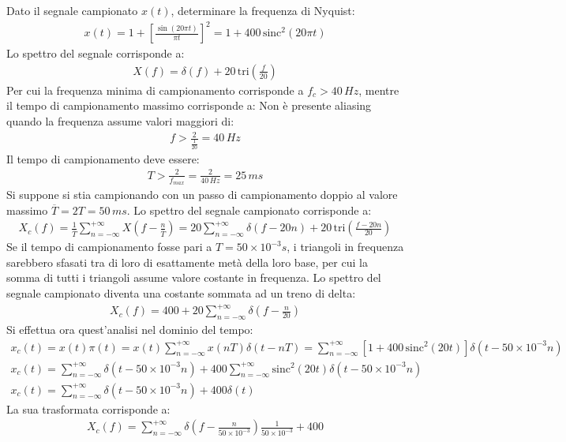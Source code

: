 \documentclass{article}
\newcommand{\sinc}{\mbox{sinc}}
\begin{document}
Dato il segnale campionato $x(t)$, determinare la frequenza di Nyquist: 
\begin{gather*}
    x(t)=1+\left[\displaystyle\frac{\sin(20\pi t)}{\pi t}\right]^2=1+400\,\sinc^2\left(20\pi t\right)
\end{gather*}
Lo spettro del segnale corrisponde a:
\begin{gather*}
    X(f)=\displaystyle \delta(f)+20\,\mbox{tri}\left(\frac{f}{20}\right)
\end{gather*}
Per cui la frequenza minima di campionamento corrisponde a $f_c>40\,Hz$, mentre il tempo di campionamento massimo corrisponde a:
Non è presente aliasing quando la frequenza assume valori maggiori di:
\begin{gather*}
    f>\displaystyle\frac{2}{\frac{1}{20}}=40\,Hz
\end{gather*}
Il tempo di campionamento deve essere:
\begin{gather}
    T>\displaystyle\frac{2}{f_{max}}=\frac{2}{40\,Hz}=25\,ms
\end{gather}
Si suppone si stia campionando con un passo di campionamento doppio al valore massimo $\overline{T}=2T=50\,ms$. Lo spettro del segnale campionato corrisponde a:
\begin{gather*}
    X_c(f)=\displaystyle \frac{1}{\overline{T}}\sum_{n=-\infty}^{+\infty}X\left(f-\frac{n}{\overline{T}}\right)=20\sum_{n=-\infty}^{+\infty}\delta(f-20n)+20\,\mbox{tri}\left(\frac{f-20n}{20}\right)
\end{gather*}
Se il tempo di campionamento fosse pari a $T=50\times10^{-3}s$, i triangoli in frequenza sarebbero sfasati tra di loro di esattamente metà della loro base, per cui la 
somma di tutti i triangoli assume valore costante in frequenza. 
Lo spettro del segnale campionato diventa una costante sommata ad un treno di delta:
\begin{gather}
    X_c(f)=400+20\displaystyle\sum_{n=-\infty}^{+\infty}\delta\left(f-\frac{n}{20}\right)
\end{gather}
Si effettua ora quest'analisi nel dominio del tempo:
\begin{gather*}
    x_c(t)=x(t)\pi(t)=x(t)\displaystyle\sum_{n=-\infty}^{+\infty}x(nT)\delta(t-nT)=\sum_{n=-\infty}^{+\infty}\left[1+400\,\sinc^2\left(20t\right)\right]\delta(t-50\times10^{-3}n)\\
    x_c(t)=\displaystyle\sum_{n=-\infty}^{+\infty}\delta(t-50\times10^{-3}n)+400\sum_{n=-\infty}^{+\infty}\sinc^2(20t)\delta(t-50\times10^{-3}n)\\
    x_c(t)=\displaystyle\sum_{n=-\infty}^{+\infty}\delta(t-50\times10^{-3}n)+400\delta(t)
\end{gather*}
La sua trasformata corrisponde a:
\begin{gather*}
    X_c(f)=\displaystyle\sum_{n=-\infty}^{+\infty}\delta\left(f-\frac{n}{50\times10^{-3}}\right)\frac{1}{50\times10^{-3}}+400
\end{gather*}
\end{document}

